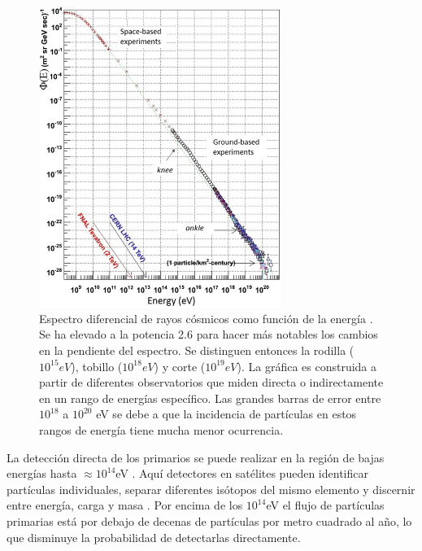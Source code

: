
    \begin{figure}[htb!]
        \begin{center}
			\includegraphics[width=0.7\textwidth]{Figs/differential_flux.png}
        \end{center}
       \caption[Espectro diferencial de rayos cósmicos como función de la energía]{Espectro diferencial de rayos cósmicos como función de la energía \parencite{mauro:oxigen}. Se ha elevado a la potencia 2.6 para hacer más notables los cambios en la pendiente del espectro. Se distinguen entonces la rodilla ($10^{15}eV$), tobillo ($10^{18}eV$) y corte ($10^{19}eV $). La gráfica es construida a partir de diferentes observatorios que miden directa o indirectamente en un rango de energías específico. Las grandes barras de error entre $10^{18}$ a $10^{20}$ eV se debe a que la incidencia de partículas en estos rangos de energía tiene mucha menor ocurrencia.}
       \label{fig:fig1}
    \end{figure}

La detección directa de los primarios se puede realizar en la región de bajas energías hasta $\approx 10^{14} $eV \parencite{mauro:oxigen}. Aquí detectores en satélites pueden identificar partículas individuales, separar diferentes isótopos del mismo elemento y discernir entre energía, carga y masa . Por encima de los $10^{14} $eV el flujo de partículas primarias está por debajo de decenas de partículas por metro cuadrado al año, lo que disminuye la probabilidad de detectarlas directamente.\\

